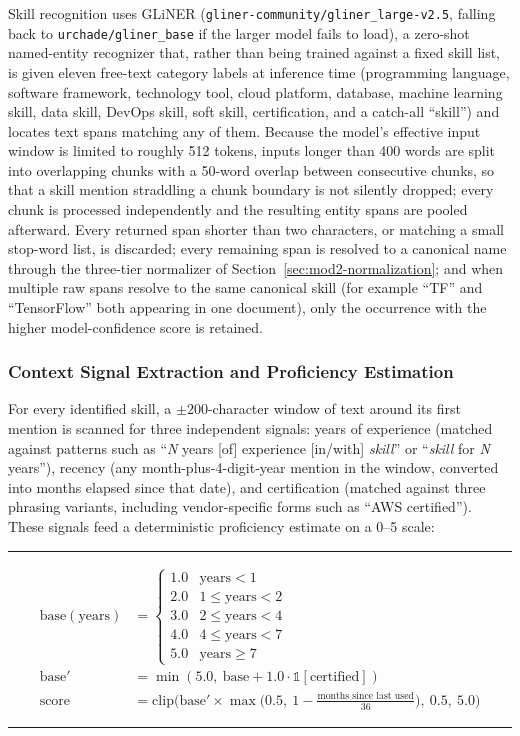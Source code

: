 \documentclass[11pt,a4paper]{article}
\newcommand{\code}[1]{\texttt{\footnotesize #1}}
\newenvironment{formulabox}
  {\begin{center}\color{TPteal}\rule{0.92\linewidth}{0.8pt}\par\vspace{5pt}\color{TPnavy}}
  {\par\vspace{3pt}\color{TPteal}\rule{0.92\linewidth}{0.8pt}\end{center}}
\begin{document}
Skill recognition uses GLiNER (\code{gliner-community/gliner\_large-v2.5}, falling back to \code{urchade/gliner\_base} if the larger model fails to load), a zero-shot named-entity recognizer that, rather than being trained against a fixed skill list, is given eleven free-text category labels at inference time (programming language, software framework, technology tool, cloud platform, database, machine learning skill, data skill, DevOps skill, soft skill, certification, and a catch-all ``skill'') and locates text spans matching any of them. Because the model's effective input window is limited to roughly 512 tokens, inputs longer than 400 words are split into overlapping chunks with a 50-word overlap between consecutive chunks, so that a skill mention straddling a chunk boundary is not silently dropped; every chunk is processed independently and the resulting entity spans are pooled afterward. Every returned span shorter than two characters, or matching a small stop-word list, is discarded; every remaining span is resolved to a canonical name through the three-tier normalizer of Section~\ref{sec:mod2-normalization}; and when multiple raw spans resolve to the same canonical skill (for example ``TF'' and ``TensorFlow'' both appearing in one document), only the occurrence with the higher model-confidence score is retained.

\subsubsection{Context Signal Extraction and Proficiency Estimation}

For every identified skill, a $\pm 200$-character window of text around its first mention is scanned for three independent signals: years of experience (matched against patterns such as ``\emph{N} years [of] experience [in/with] \emph{skill}'' or ``\emph{skill} for \emph{N} years''), recency (any month-plus-4-digit-year mention in the window, converted into months elapsed since that date), and certification (matched against three phrasing variants, including vendor-specific forms such as ``AWS certified''). These signals feed a deterministic proficiency estimate on a 0--5 scale:

\begin{formulabox}
\begin{align}
\label{eq:proficiency}
\text{base}(\text{years}) &= \begin{cases}
1.0 & \text{years} < 1 \\
2.0 & 1 \leq \text{years} < 2 \\
3.0 & 2 \leq \text{years} < 4 \\
4.0 & 4 \leq \text{years} < 7 \\
5.0 & \text{years} \geq 7
\end{cases} \nonumber \\[4pt]
\text{base}' &= \min(5.0,\ \text{base} + 1.0 \cdot \mathbb{1}[\text{certified}]) \nonumber \\[4pt]
\text{score} &= \mathrm{clip}\!\Big(\text{base}' \times \max\big(0.5,\ 1 - \tfrac{\text{months since last used}}{36}\big),\ 0.5,\ 5.0\Big)
\end{align}
\end{formulabox}
\end{document}
